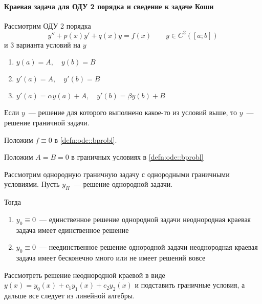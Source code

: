 \documentclass{trlnotes}
\begin{document}
\paragraph{Краевая задача для ОДУ 2 порядка и сведение к задаче Коши}
\label{par:ode::bprobl}
\begin{defn}\label{defn:ode::bprobl}
  Рассмотрим ОДУ 2 порядка
  \[
    y'' + p(x) y' + q(x) y = f(x) \qquad y \in C^2([a;b])
  \]
  и 3 варианта условий на $y$
  \begin{enumerate}[I]
    \item $y(a) = A, \quad y(b) = B$ \label{it:ode::bprobl::cond:i}
    \item $y'(a) = A, \quad y'(b) = B$ \label{it:ode::bprobl::cond::ii}
    \item $y'(a) = α y(a) + A, \quad y'(b) = βy(b) + B$ \label{it:ode::bprobl::cond::iii}
    \end{enumerate}
  
  Если $y$~--- решение для которого выполнено какое-то из условий выше, то $y$~--- решение
  граничной задачи.
\end{defn}

\begin{defn}\label{defn:ode::bprobl::hom}
  Положим $f \equiv 0$ в \ref{defn:ode::bprobl}.
\end{defn}
\begin{defn}\label{defn:ode::bprobl::hombnd}
  Положим $A = B = 0$ в граничных условиях в \ref{defn:ode::bprobl}
\end{defn}

\begin{thrm}[об альтернативе]\label{thrm:ode::bprobl::alt}
  Рассмотрим однородную граничную задачу с однородными граничными условиями.
  Пусть $y_H$~--- решение однородной задачи. 

  Тогда
  \begin{enumerate}
    \item $y_0 \equiv 0$~--- единственное решение однородной задачи \so неоднородная краевая 
      задача имеет единственное решение
    \item $y_0 \equiv 0$~--- неединственное решение однородной задачи \so неоднородная краевая 
      задача имеет бесконечно много или не имеет решений вовсе
  \end{enumerate}
\end{thrm}


\begin{prf}
  Рассмотреть решение неоднородной краевой в виде $y(x) = y_0(x) + c_1 y_1(x) + c_2 y_2(x)$
  и подставить граничные условия, а дальше все следует из линейной алгебры.
\end{prf}
\end{document}
